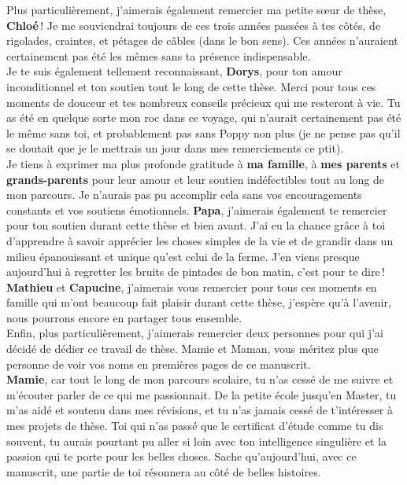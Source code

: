 Plus particulièrement, j’aimerais également remercier ma petite sœur de thèse, \textbf{Chloé} ! Je me souviendrai toujours de ces trois années passées à tes côtés, de rigolades, craintes, et pétages de câbles (dans le bon sens). Ces années n’auraient certainement pas été les mêmes sans ta présence indispensable.\\ 

Je te suis également tellement reconnaissant, \textbf{Dorys}, pour ton amour inconditionnel et ton soutien tout le long de cette thèse. Merci pour tous ces moments de douceur et tes nombreux conseils précieux qui me resteront à vie. Tu as été en quelque sorte mon roc dans ce voyage, qui n'aurait certainement pas été le même sans toi, et probablement pas sans Poppy non plus (je ne pense pas qu’il se doutait que je le mettrais un jour dans mes remerciements ce ptit). \\

Je tiens à exprimer ma plus profonde gratitude à \textbf{ma famille}, à \textbf{mes parents} et \textbf{grands-parents} pour leur amour et leur soutien indéfectibles tout au long de mon parcours. Je n'aurais pas pu accomplir cela sans vos encouragements constants et vos soutiens émotionnels. \textbf{Papa}, j’aimerais également te remercier pour ton soutien durant cette thèse et bien avant. J'ai eu la chance grâce à toi d’apprendre à savoir apprécier les choses simples de la vie et de grandir dans un milieu épanouissant et unique qu'est celui de la ferme. J’en viens presque aujourd’hui à regretter les bruits de pintades de bon matin, c’est pour te dire ! \textbf{Mathieu} et \textbf{Capucine}, j'aimerais vous remercier pour tous ces moments en famille qui m'ont beaucoup fait plaisir durant cette thèse, j'espère qu'à l'avenir, nous pourrons encore en partager tous ensemble. \\ 

Enfin, plus particulièrement, j’aimerais remercier deux personnes pour qui j’ai décidé de dédier ce travail de thèse. Mamie et Maman, vous méritez plus que personne de voir vos noms en premières pages de ce manuscrit. \\

\textbf{Mamie}, car tout le long de mon parcours scolaire, tu n’as cessé de me suivre et m’écouter parler de ce qui me passionnait. De la petite école jusqu’en Master, tu m’as aidé et soutenu dans mes révisions, et tu n’as jamais cessé de t’intéresser à mes projets de thèse. Toi qui n’as passé que le certificat d’étude comme tu dis souvent, tu aurais pourtant pu aller si loin avec ton intelligence singulière et la passion qui te porte pour les belles choses. Sache qu'aujourd'hui, avec ce manuscrit, une partie de toi résonnera au côté de belles histoires.\\

